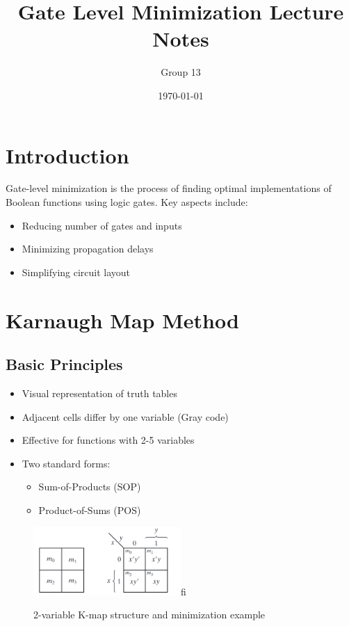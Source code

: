 \documentclass[11pt]{article}
\title{Gate Level Minimization Lecture Notes}
\author{Group 13}
\date{\today}
\begin{document}
\maketitle

\section{Introduction}
Gate-level minimization is the process of finding optimal implementations of Boolean functions using logic gates. Key aspects include:
\begin{itemize}
\item Reducing number of gates and inputs
\item Minimizing propagation delays
\item Simplifying circuit layout
\end{itemize}

\section{Karnaugh Map Method}
\subsection{Basic Principles}
\begin{itemize}
\item Visual representation of truth tables
\item Adjacent cells differ by one variable (Gray code)
\item Effective for functions with 2-5 variables
\item Two standard forms:
  \begin{itemize}
  \item Sum-of-Products (SOP)
  \item Product-of-Sums (POS)
  \end{itemize}
\end{itemize}

\begin{figure}[htbp]
\centering
\includegraphics[width=0.5\textwidth]{figs/2var.png}fi
\caption{2-variable K-map structure and minimization example}
\label{fig:2var}
\end{figure}
\end{document}
